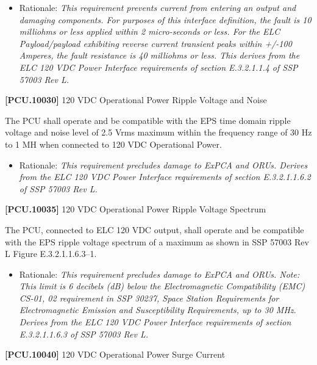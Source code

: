 \documentclass[12pt,oneside,oldfontcommands]{memoir}
\begin{document}
\begin{itemize}
\item{} Rationale: \emph{This requirement prevents current from entering an output and damaging components. For purposes of this interface definition, the fault is 10 milliohms or less applied within 2 micro-seconds or less. For the ELC Payload\slash payload exhibiting reverse current transient peaks within +\slash -100 Amperes, the fault resistance is 40 milliohms or less. This derives from the ELC 120 VDC Power Interface requirements of section E.3.2.1.1.4 of SSP 57003 Rev L.}

\end{itemize}

\textbf{[PCU.10030]} 120 \gls{VDC} Operational Power Ripple Voltage and Noise

The \gls{PCU} shall operate and be compatible with the EPS time domain ripple voltage and noise level of 2.5 Vrms maximum within the frequency range of 30 Hz to 1 MH when connected to 120 \gls{VDC} Operational Power.

\begin{itemize}
\item{} Rationale: \emph{This requirement precludes damage to ExPCA and ORUs. Derives from the ELC 120 VDC Power Interface requirements of section E.3.2.1.1.6.2 of SSP 57003 Rev L.}

\end{itemize}

\textbf{[PCU.10035]} 120 \gls{VDC} Operational Power Ripple Voltage Spectrum

The \gls{PCU}, connected to \gls{ELC} 120 \gls{VDC} output, shall operate and be compatible with the EPS ripple voltage spectrum of a maximum as shown in SSP 57003 Rev L Figure E.3.2.1.1.6.3--1.

\begin{itemize}
\item{} Rationale: \emph{This requirement precludes damage to ExPCA and ORUs. Note: This limit is 6 decibels (dB) below the Electromagnetic Compatibility (EMC) CS-01, 02 requirement in SSP 30237, Space Station Requirements for Electromagnetic Emission and Susceptibility Requirements, up to 30 MHz. Derives from the ELC 120 VDC Power Interface requirements of section E.3.2.1.1.6.3 of SSP 57003 Rev L.}

\end{itemize}

\textbf{[PCU.10040]} 120 \gls{VDC} Operational Power Surge Current
\end{document}
